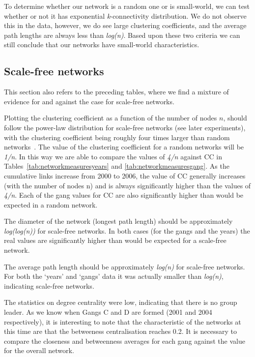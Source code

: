 \documentclass[twocolumn]{svjour3}          %
\theoremstyle{definition}
\begin{document}
To determine whether our network is a random one or is small-world, we
can test whether or not it has exponential \emph{k}-connectivity
distribution. We do not observe this in the data, however, we do see
large clustering coefficients, and the average path lengths are always
less than {\emph{log(n)}}. Based upon these two criteria we can still
conclude that our networks have small-world characteristics.


\subsection{Scale-free networks}\label{sec:scalefree}

This section also refers to the preceding tables, where we find a
mixture of evidence for and against the case for scale-free networks.

Plotting the clustering coefficient as a function of the number of
nodes $n$, should follow the power-law distribution for scale-free
networks (see later experiments), with the clustering coefficient
being roughly four times larger than random
networks~\citep{AlbAlbNak04}. The value of the clustering coefficient
for a random networks will be \emph{1/n}. In this way we are able to
compare the values of \emph{4/n} against CC in
Tables~\ref{tab:networkmeasuresyears} and
\ref{tab:networkmeasuresgang}. As the cumulative links increase from
2000 to 2006, the value of CC generally increases (with the number of
nodes n) and is always significantly higher than the values of
\emph{4/n}. Each of the gang values for CC are also significantly
higher than would be expected in a random network.

The diameter of the network (longest path length) should be
approximately \emph{log(log(n))} for scale-free networks. In both
cases (for the gangs and the years) the real values are significantly
higher than would be expected for a scale-free network.

The average path length should be approximately \emph{log(n)} for
scale-free networks. For both the `years' and `gangs' data it was
actually smaller than \emph{log(n)}, indicating scale-free networks.

The statistics on degree centrality were low, indicating that there is
no group leader. As we know when Gangs C and D are formed (2001
and 2004 respectively), it is interesting to note that the
characteristic of the networks at this time are that the betweeness
centralisation reaches 0.2. It is necessary to compare the closeness and
betweenness averages for each gang against the value for the overall
network.
\end{document}
